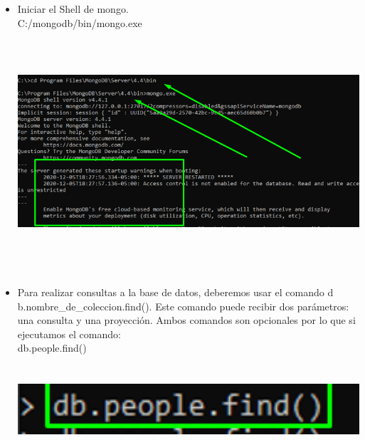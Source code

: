 \documentclass[12pt,a4paper,oneside]{book}
\begin{document}
	\newpage
\begin{itemize}
	\item {Iniciar el Shell de mongo.\\
		C:/mongodb/bin/mongo.exe
	}\\
	
	\includegraphics[width=16cm, height=9cm]{img/10.png}\\
	
	\item {Para realizar consultas a la base de datos, deberemos usar el comando d b.nombre\_de\_coleccion.find(). Este comando puede recibir dos parámetros: una consulta y una proyección. Ambos comandos son opcionales por lo que si ejecutamos el comando:\\
		
	db.people.find()
	 }\\
	
	\includegraphics[width=16cm, height=4cm]{img/11.png}\\
	
	
\end{itemize}
\end{document}
